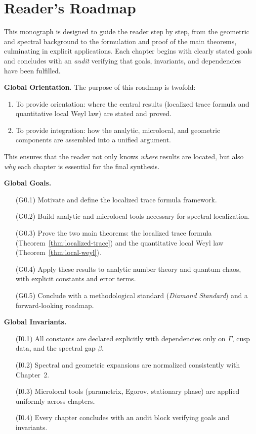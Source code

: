 \section*{Reader's Roadmap}

This monograph is designed to guide the reader step by step,
from the geometric and spectral background to the formulation
and proof of the main theorems, culminating in explicit applications.
Each chapter begins with clearly stated goals and concludes
with an \emph{audit} verifying that goals, invariants, and
dependencies have been fulfilled.

\medskip

\noindent\textbf{Global Orientation.}
The purpose of this roadmap is twofold:
\begin{enumerate}
  \item To provide orientation: where the central results
  (localized trace formula and quantitative local Weyl law)
  are stated and proved.
  \item To provide integration: how the analytic, microlocal,
  and geometric components are assembled into a unified argument.
\end{enumerate}
This ensures that the reader not only knows \emph{where}
results are located, but also \emph{why} each chapter is essential
for the final synthesis.

\medskip

\noindent\textbf{Global Goals.}
\begin{itemize}
  \item[(G0.1)] Motivate and define the localized trace formula framework.
  \item[(G0.2)] Build analytic and microlocal tools necessary
  for spectral localization.
  \item[(G0.3)] Prove the two main theorems:
  the localized trace formula (Theorem~\ref{thm:localized-trace})
  and the quantitative local Weyl law (Theorem~\ref{thm:local-weyl}).
  \item[(G0.4)] Apply these results to analytic number theory
  and quantum chaos, with explicit constants and error terms.
  \item[(G0.5)] Conclude with a methodological standard
  (\emph{Diamond Standard}) and a forward-looking roadmap.
\end{itemize}

\medskip

\noindent\textbf{Global Invariants.}
\begin{itemize}
  \item[(I0.1)] All constants are declared explicitly with dependencies
  only on $\Gamma$, cusp data, and the spectral gap $\beta$.
  \item[(I0.2)] Spectral and geometric expansions are normalized consistently
  with Chapter~2.
  \item[(I0.3)] Microlocal tools (parametrix, Egorov, stationary phase)
  are applied uniformly across chapters.
  \item[(I0.4)] Every chapter concludes with an audit block
  verifying goals and invariants.
\end{itemize}

